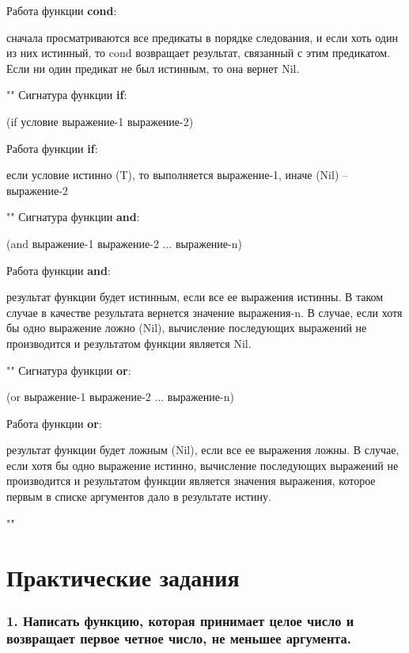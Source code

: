 \documentclass[12pt]{report}
\begin{document}
\indent Работа функции \textbf{cond}: 

сначала просматриваются все предикаты в порядке следования, и если хоть один из них истинный, то cond возвращает результат, связанный с этим предикатом. Если ни один предикат не был истинным, то она вернет Nil. 

""\newline
Сигнатура функции \textbf{if}: 

(if условие выражение-1 выражение-2)\newline

\indent Работа функции \textbf{if}: 

если условие истинно (T), то выполняется выражение-1, иначе (Nil) – выражение-2\newline

""\newline
Сигнатура функции \textbf{and}: 

(and выражение-1 выражение-2 ... выражение-n)\newline

\indent Работа функции \textbf{and}: 

результат функции будет истинным, если все ее выражения истинны. В таком случае в качестве результата вернется значение выражения-n. В случае, если хотя бы одно выражение ложно (Nil), вычисление последующих выражений не производится и результатом функции является Nil.\newline

""\newline
Сигнатура функции \textbf{or}: 

(or выражение-1 выражение-2 ... выражение-n)\newline

Работа функции \textbf{or}: 

результат функции будет ложным (Nil), если все ее выражения ложны. В случае, если хотя бы одно выражение истинно, вычисление последующих выражений не производится и результатом функции является значения выражения, которое первым в списке аргументов дало в результате истину.\newline



""\newline
\chapter*{Практические задания}

\subsection*{1. Написать функцию, которая принимает целое число и возвращает первое четное число, не меньшее аргумента.}
\end{document}
